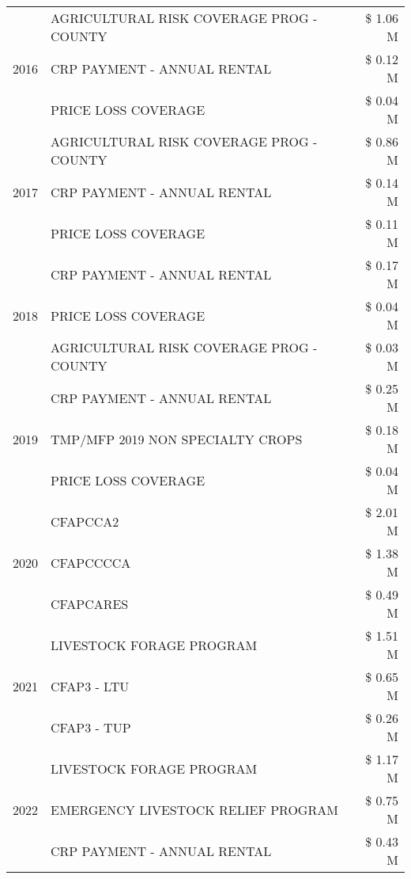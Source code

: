 \begin{tabular}{llr}
\cline{1-3}
\multirow[t]{3}{*}{2016} & AGRICULTURAL RISK COVERAGE PROG - COUNTY & \$ 1.06 M \\
 & CRP PAYMENT - ANNUAL RENTAL & \$ 0.12 M \\
 & PRICE LOSS COVERAGE & \$ 0.04 M \\
\cline{1-3}
\multirow[t]{3}{*}{2017} & AGRICULTURAL RISK COVERAGE PROG - COUNTY & \$ 0.86 M \\
 & CRP PAYMENT - ANNUAL RENTAL & \$ 0.14 M \\
 & PRICE LOSS COVERAGE & \$ 0.11 M \\
\cline{1-3}
\multirow[t]{3}{*}{2018} & CRP PAYMENT - ANNUAL RENTAL & \$ 0.17 M \\
 & PRICE LOSS COVERAGE & \$ 0.04 M \\
 & AGRICULTURAL RISK COVERAGE PROG - COUNTY & \$ 0.03 M \\
\cline{1-3}
\multirow[t]{3}{*}{2019} & CRP PAYMENT - ANNUAL RENTAL & \$ 0.25 M \\
 & TMP/MFP 2019 NON SPECIALTY CROPS & \$ 0.18 M \\
 & PRICE LOSS COVERAGE & \$ 0.04 M \\
\cline{1-3}
\multirow[t]{3}{*}{2020} & CFAPCCA2 & \$ 2.01 M \\
 & CFAPCCCCA & \$ 1.38 M \\
 & CFAPCARES & \$ 0.49 M \\
\cline{1-3}
\multirow[t]{3}{*}{2021} & LIVESTOCK FORAGE PROGRAM & \$ 1.51 M \\
 & CFAP3 - LTU & \$ 0.65 M \\
 & CFAP3 - TUP & \$ 0.26 M \\
\cline{1-3}
\multirow[t]{3}{*}{2022} & LIVESTOCK FORAGE PROGRAM & \$ 1.17 M \\
 & EMERGENCY LIVESTOCK RELIEF PROGRAM & \$ 0.75 M \\
 & CRP PAYMENT - ANNUAL RENTAL & \$ 0.43 M \\
\cline{1-3}
\bottomrule
\end{tabular}
